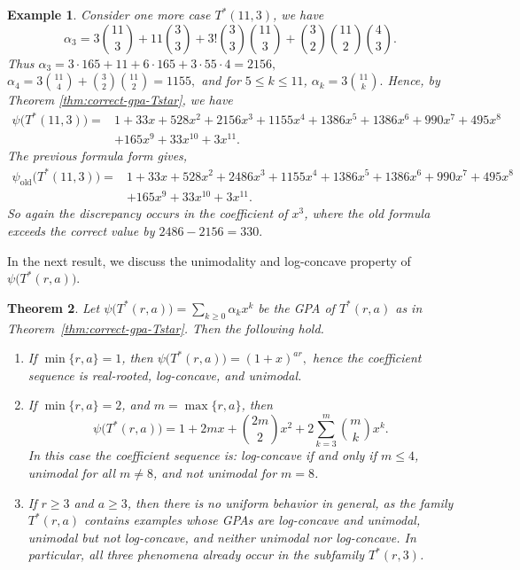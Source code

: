 \documentclass[12pt,twoside]{article}
\newtheorem{theorem}{Theorem}[section]
\newtheorem{example}[theorem]{Example}
\begin{document}
\begin{example}
		 Consider one more case $T^*(11,3)$,  we have
			$$
			\alpha_3
			=
			3\binom{11}{3}
			+
			11\binom{3}{3}
			+
			3!\binom{3}{3}\binom{11}{3}
			+
			\binom{3}{2}\binom{11}{2}\binom{4}{3}.
			$$
			Thus $	\alpha_3	=	3\cdot 165+11+6\cdot 165+3\cdot 55\cdot 4=2156, $  $\alpha_4=3\binom{11}{4}	+		\binom{3}{2}\binom{11}{2}  =1155,$ 
			and for $5\le k\le 11$, $ 	\alpha_k=3\binom{11}{k}. $ Hence, by Theorem \ref{thm:correct-gpa-Tstar}, we have
			 \begin{align*}
			 	\psi\bigl(T^*(11,3)\bigr) =& 1+33x+528x^2+2156x^3+1155x^4+1386x^5+1386x^6+990x^7+495x^8\\
			 	&+165x^9+33x^{10}+3x^{11}.
			 \end{align*} 
			The previous formula form \cite{0} gives, 
			 \begin{align*}
			 		\psi_{\mathrm{old}}\bigl(T^*(11,3)\bigr)= & 1+33x+528x^2+2486x^3+1155x^4+1386x^5+1386x^6+990x^7+495x^8\\
			 		&+165x^9+33x^{10}+3x^{11}.
			 \end{align*} 
			So again the discrepancy occurs in the coefficient of $x^3$, where the old formula exceeds the correct value by
			$ 2486-2156=330. $
		\end{example}
		
		
		
		
		
		
		
	
			In the next result, we discuss the unimodality and log-concave property of $\psi\bigl(T^*(r,a)\bigr).$
		\begin{theorem}\label{thm:Tstar-shape}
			Let $\psi\bigl(T^*(r,a)\bigr)=\sum_{k\ge 0}\alpha_kx^k$	be the  GPA of $T^*(r,a)$ as in Theorem~\ref{thm:correct-gpa-Tstar}. Then the following hold. 
			\begin{enumerate}[label=\textup{(\roman*)}]
				\item If $\min\{r,a\}=1$, then $\psi\bigl(T^*(r,a)\bigr)=(1+x)^{ar},$ hence the coefficient sequence is real-rooted, log-concave, and unimodal.
				
				\item If $\min\{r,a\}=2$, and $m=\max\{r,a\}$, then
				$$
				\psi\bigl(T^*(r,a)\bigr)
				=
				1+2mx+\binom{2m}{2}x^2+2\sum_{k=3}^{m}\binom{m}{k}x^k.
				$$
				In this case the coefficient sequence is: log-concave if and only if $m\le 4$,  unimodal for all $m\neq 8$, and   not unimodal for $m=8$.
				
				\item If $r\ge 3$ and $a\ge 3$, then there is no uniform behavior in general, as the family $T^*(r,a)$ contains examples whose  GPAs are log-concave and unimodal,  unimodal but not log-concave, and  neither unimodal nor log-concave. In particular, all three phenomena already occur in the subfamily $T^*(r,3)$.
			\end{enumerate}
		\end{theorem}
		
\end{document}
